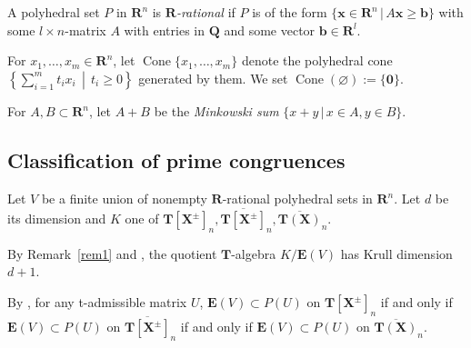\documentclass[a4paper,12pt]{amsart}
\theoremstyle{plain}
\theoremstyle{definition}
\begin{document}
A polyhedral set $P$ in $\boldsymbol{R}^n$ is \textit{$\boldsymbol{R}$-rational} if $P$ is of the form $\{ \boldsymbol{x} \in \boldsymbol{R}^n \,|\, A\boldsymbol{x} \ge \boldsymbol{b} \}$ with some $l \times n$-matrix $A$ with entries in $\boldsymbol{Q}$ and some vector $\boldsymbol{b} \in \boldsymbol{R}^l$.

For $x_1, \ldots, x_m \in \boldsymbol{R}^n$, let $\operatorname{Cone}\{x_1, \ldots, x_m \}$ denote the polyhedral cone $\left\{ \sum_{i = 1}^m t_ix_i \,\middle|\, t_i \ge 0 \right\}$ generated by them.
We set $\operatorname{Cone}(\varnothing) := \{ \boldsymbol{0}\}$.

For $A, B \subset \boldsymbol{R}^n$, let $A + B$ be the \textit{Minkowski sum} $\{ x + y \,|\, x \in A, y \in B \}$.

\subsection{Classification of prime congruences}
    \label{subsection4.2}

Let $V$ be a finite union of nonempty $\boldsymbol{R}$-rational polyhedral sets in $\boldsymbol{R}^n$.
Let $d$ be its dimension and $K$ one of $\boldsymbol{T}[\boldsymbol{X}^{\pm}]_n, \overline{\boldsymbol{T}[\boldsymbol{X}^{\pm}]}_n, \overline{\boldsymbol{T}(\boldsymbol{X})}_n$.

By Remark~\ref{rem1} and \cite[Corollaries~3.26 and 4.6]{Nakajima=Song}, the quotient $\boldsymbol{T}$-algebra $K / \boldsymbol{E}(V)$ has Krull dimension $d + 1$.

By \cite[Proposition~2.13 and Proposition~3.9(ii), (iii)]{Joo=Mincheva2}, for any t-admissible matrix $U$, $\boldsymbol{E}(V) \subset P(U)$ on $\boldsymbol{T}[\boldsymbol{X}^{\pm}]_n$ if and only if $\boldsymbol{E}(V) \subset P(U)$ on $\overline{\boldsymbol{T}[\boldsymbol{X}^{\pm}]}_n$ if and only if $\boldsymbol{E}(V) \subset P(U)$ on $\overline{\boldsymbol{T}(\boldsymbol{X})}_n$.
\end{document}
